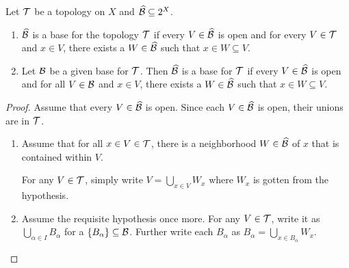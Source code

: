 \begin{theorem*} \label{thm:base}
    Let $\mathcal{T}$ be a topology on $X$ and $\widehat{\mathcal{B}} \subseteq 2^X$.
    \begin{enumerate}
        \item $\widehat{\mathcal{B}}$ is a base for the topology $\mathcal{T}$ if every
            $V \in \widehat{\mathcal{B}}$ is open and for every $V \in \mathcal{T}$ and
            $x \in V$, there exists a $W \in \widehat{\mathcal{B}}$ such that
            $x \in W \subseteq V$. \label{thm:base:open}
        \item Let $\mathcal{B}$ be a given base for $\mathcal{T}$.
            Then $\widehat{\mathcal{B}}$ is a base for $\mathcal{T}$ if every
            $V \in \widehat{\mathcal{B}}$ is open and for all $V \in \mathcal{B}$ and
            $x \in V$, there exists a $W \in \widehat{\mathcal{B}}$ such that
            $x \in W \subseteq V$. \label{thm:base:basic}
    \end{enumerate}
\end{theorem*}
\begin{proof}
    Assume that every $V \in \widehat{\mathcal{B}}$ is open.
    Since each $V \in \widehat{\mathcal{B}}$ is open, their unions are in $\mathcal{T}$.
    \begin{enumerate}
        \item Assume that for all $x \in V \in \mathcal{T}$, there is a neighborhood
            $W \in \widehat{\mathcal{B}}$ of $x$ that is contained within $V$.

            For any $V \in \mathcal{T}$, simply write $V = \bigcup_{x \in V} W_x$
            where $W_x$ is gotten from the hypothesis.
        \item Assume the requisite hypothesis once more.
            For any $V \in \mathcal{T}$, write it as
            $\bigcup_{\alpha \in I} B_\alpha$ for a
            $\{B_\alpha\} \subseteq \mathcal{B}$.
            Further write each $B_\alpha$ as
            $B_\alpha = \bigcup_{x \in B_\alpha} W_x$. \qedhere
    \end{enumerate}
\end{proof}
